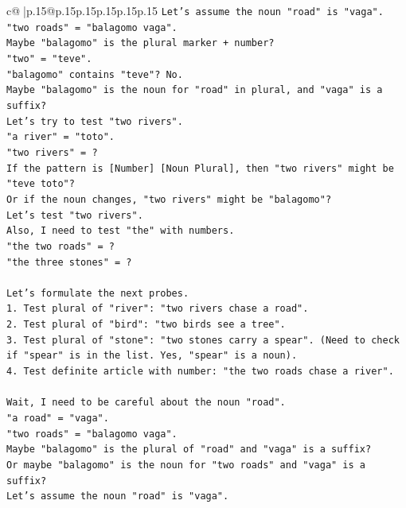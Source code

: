 \documentclass{article}
\begin{document}
{\begin{supertabular}{c@{$\;$}|p{.15\linewidth}@{}p{.15\linewidth}p{.15\linewidth}p{.15\linewidth}p{.15\linewidth}p{.15\linewidth}}
{{{\texttt{Let's assume the noun "road" is "vaga".} \\
\texttt{"two roads" = "balagomo vaga".} \\
\texttt{Maybe "balagomo" is the plural marker + number?} \\
\texttt{"two" = "teve".} \\
\texttt{"balagomo" contains "teve"? No.} \\
\texttt{Maybe "balagomo" is the noun for "road" in plural, and "vaga" is a suffix?} \\
\texttt{Let's try to test "two rivers".} \\
\texttt{"a river" = "toto".} \\
\texttt{"two rivers" = ?} \\
\texttt{If the pattern is {[}Number{]} {[}Noun Plural{]}, then "two rivers" might be "teve toto"?} \\
\texttt{Or if the noun changes, "two rivers" might be "balagomo"?} \\
\texttt{Let's test "two rivers".} \\
\texttt{Also, I need to test "the" with numbers.} \\
\texttt{"the two roads" = ?} \\
\texttt{"the three stones" = ?} \\
\\ 
\texttt{Let's formulate the next probes.} \\
\texttt{1. Test plural of "river": "two rivers chase a road".} \\
\texttt{2. Test plural of "bird": "two birds see a tree".} \\
\texttt{3. Test plural of "stone": "two stones carry a spear". (Need to check if "spear" is in the list. Yes, "spear" is a noun).} \\
\texttt{4. Test definite article with number: "the two roads chase a river".} \\
\\ 
\texttt{Wait, I need to be careful about the noun "road".} \\
\texttt{"a road" = "vaga".} \\
\texttt{"two roads" = "balagomo vaga".} \\
\texttt{Maybe "balagomo" is the plural of "road" and "vaga" is a suffix?} \\
\texttt{Or maybe "balagomo" is the noun for "two roads" and "vaga" is a suffix?} \\
\texttt{Let's assume the noun "road" is "vaga".} \\
}}}
\end{supertabular}}
\end{document}
